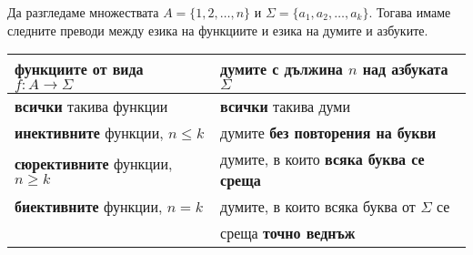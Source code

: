 \begin{remark}
  Да разгледаме множествата $A=\{1,2,\dots,n\}$ и $\Sigma = \{a_1,a_2,\dots,a_k\}$.
  Тогава имаме следните преводи между езика на функциите и езика на думите и азбуките.
  \newline
  \begin{tabular}{|l|l|}
    \hline
    функциите от вида $f:A\to \Sigma$ & думите с дължина $n$ над азбуката $\Sigma$ \\
    \hline
    \hline
    {\bf всички} такива функции & {\bf всички} такива думи\\
    \hline
    {\bf инективните} функции, $n \leq k$ & думите  {\bf без повторения на букви} \\
    \hline
    {\bf сюрективните} функции, $n \geq k$ & думите, в които {\bf всяка буква се среща} \\
    \hline
    {\bf биективните} функции, $n = k$ & думите, в които всяка буква от $\Sigma$ се \\
    & среща {\bf точно веднъж} \\
    \hline
  \end{tabular}


\end{remark}

